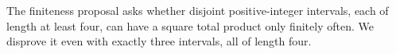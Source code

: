 The finiteness proposal asks whether disjoint positive-integer intervals, each of length at least four, can have a square total product only finitely often. We disprove it even with exactly three intervals, all of length four.
